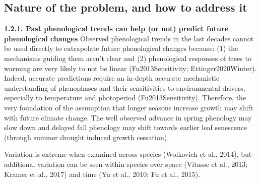 \documentclass{article}
\begin{document}
\subsection{Nature of the problem, and how to address it}

\textbf{1.2.1. Past phenological trends can help (or not) predict future phenological changes}
Observed phenological trends in the last decades cannot be used directly to extrapolate future phenological changes because: (1) the mechanisms guiding them aren't clear and (2) phenological responses of trees to warming are very likely to not be linear (Fu2013Sensitivity; Ettinger2020Winter). Indeed, accurate predictions require an in-depth accurate mechanistic understanding of phenophases and their sensitivities to environmental drivers, especially to temperature and photoperiod (Fu2013Sensitivity). Therefore, the very foundation of the assumption that longer seasons increase growth may shift with future climate change. The well observed advance in spring phenology may slow down and delayed fall phenology may shift towards earlier leaf senescence (through summer drought induced growth cessation).

Variation is extreme when examined across species (Wolkovich et al., 2014), but additional variation can be seen within species over space (Vitasse et al., 2013; Kramer et al., 2017) and time (Yu et al., 2010; Fu et al., 2015). 
\end{document}
